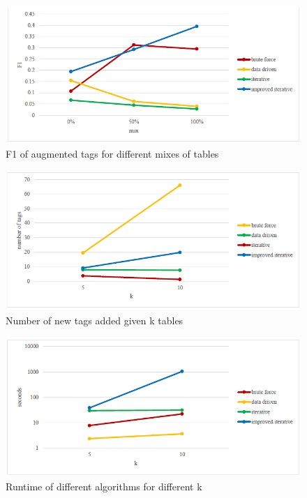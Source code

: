 \begin{figure}
    \centering
    \includegraphics[width=5in]{figures/f1-of-augmented-tags-for-different-mixes-of-tables.png}
    \caption{F1 of augmented tags for different mixes of tables}
    \label{fig:f1-of-augmented-tags-for-different-mixes-of-tables}
\end{figure}

\begin{figure}
    \centering
    \includegraphics[width=5in]{figures/number-of-new-tags-added-given-k-tables.png}
    \caption{Number of new tags added given k tables}
    \label{fig:number-of-new-tags-added-given-k-tables}
\end{figure}

\begin{figure}
    \centering
    \includegraphics[width=5in]{figures/runtime-of-different-algorithms-for-different-k.png}
    \caption{Runtime of different algorithms for different k}
    \label{fig:runtime-of-different-algorithms-for-different-k}
\end{figure}
